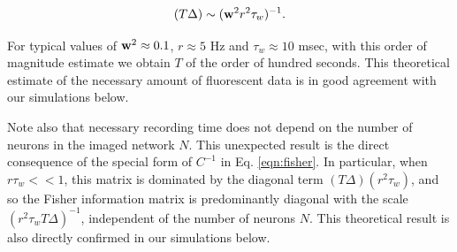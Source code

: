 \begin{equation}
(T\Delta) \sim (\bw^2 r^2  \tau_w)^{-1}.
\end{equation}

For typical values of $\mathbf{w}^2\approx 0.1$, $r\approx 5$  Hz and $ \tau_w \approx 10$ msec, 
with this order of magnitude estimate we obtain $T$ of the order of hundred seconds. This theoretical estimate of the necessary amount of fluorescent data is in good agreement with our simulations below.

Note also that necessary recording time does not depend on the number of neurons in the imaged network $N$. This unexpected result is the direct consequence of the special form of $C^{-1}$ in Eq. \ref{eqn:fisher}. In particular, when $r \tau_w <<1$, this matrix is dominated by the diagonal term $(T\Delta)(r^2  \tau_w)$, and so the Fisher information matrix is predominantly diagonal with the scale $(r^2 \tau_w T\Delta)^{-1}$, independent of the number of neurons $N$. This theoretical result is also directly confirmed in our simulations below.
